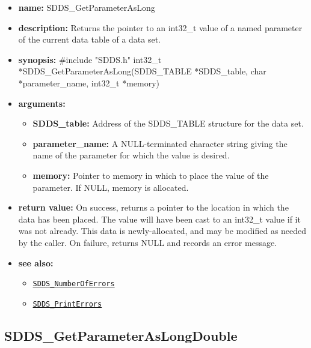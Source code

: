 \documentclass[11pt]{article}
\newcommand{\progref}[1]{\hyperref[SDDS_#1]{\tt SDDS\_#1}}
\begin{document}
\begin{itemize}
\item {\bf name:}\newline
SDDS\_GetParameterAsLong
\item {\bf description:}\newline
Returns the pointer to an int32\_t value of a named parameter of the current data table of a data set.
\item {\bf synopsis:} \#include "SDDS.h"\newline
int32\_t *SDDS\_GetParameterAsLong(SDDS\_TABLE *SDDS\_table, char *parameter\_name, int32\_t *memory)
\item {\bf arguments:}
\begin{itemize}
\item {\bf SDDS\_table:} Address of the SDDS\_TABLE structure for the data set.
\item {\bf parameter\_name:} A NULL-terminated character string giving the name of the parameter for which the value is desired.
\item {\bf memory:} Pointer to memory in which to place the value of the parameter. If NULL, memory is allocated.
\end{itemize}
\item {\bf return value:}\newline
On success, returns a pointer to the location in which the data has been placed. The value will have been cast to an int32\_t value if it was not already. This data is newly-allocated, and may be modified as needed by the caller. On failure, returns NULL and records an error message.
\item {\bf see also:}
\begin{itemize}
\item \progref{NumberOfErrors}
\item \progref{PrintErrors}
\end{itemize}
\end{itemize}

\subsection{SDDS\_GetParameterAsLongDouble}
\label{SDDS_GetParameterAsDouble}
\end{document}
